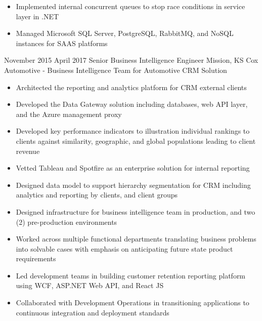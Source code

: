 
\ExperienceExpanded
{
    \begin{itemize}
        \item Implemented internal concurrent queues to stop race conditions in
        service layer in .NET
        \item Managed Microsoft SQL Server, PostgreSQL, RabbitMQ, and NoSQL
        instances for SAAS platforms
    \end{itemize}
}

\vspace*{0.1 in}

\ProjectExperience
{November 2015}
{April 2017}
{Senior Business Intelligence Engineer}
{Mission, KS}
{Cox Automotive - Business Intelligence Team for Automotive CRM Solution}
{
    \begin{itemize}
        \item Architected the reporting and analytics platform for CRM external
        clients
        \item Developed the Data Gateway solution including databases, web API
        layer, and the Azure management proxy
        \item Developed key performance indicators to illustration individual
        rankings to clients against similarity, geographic, and global
        populations leading to client revenue
    \end{itemize}
}
{
    \begin{itemize}
        \item Vetted Tableau and Spotfire as an enterprise solution for internal
        reporting
        \item Designed data model to support hierarchy segmentation for CRM
        including analytics and reporting by clients, and client groups
        \item Designed infrastructure for business intelligence team in
        production, and two (2) pre-production environments
    \end{itemize}
}
{
    \begin{itemize}
        \item Worked across multiple functional departments translating business
        problems into solvable cases with emphasis on anticipating future state
        product requirements
        \item Led development teams in building customer retention reporting
        platform using WCF, ASP.NET Web API, and React JS
        \item Collaborated with Development Operations in transitioning
        applications to continuous integration and deployment standards
    \end{itemize}
}

